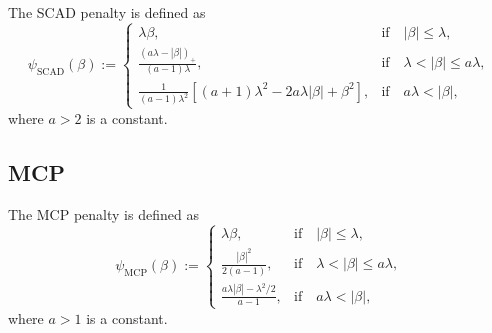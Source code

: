 The SCAD penalty is defined as
\begin{equation*}
	\psi_{\text{SCAD}}(\beta):=\left\{\begin{array}{ll}
		\lambda\beta,                                                                                  & \text{if}\quad\left|\beta\right|\leq\lambda,           \\
		\frac{\left(a\lambda-\left|\beta\right|\right)_{+}}{(a-1)\lambda},                             & \text{if}\quad\lambda<\left|\beta\right|\leq a\lambda, \\
		\frac{1}{(a-1)\lambda^{2}}\left[(a+1)\lambda^{2}-2a\lambda\left|\beta\right|+\beta^{2}\right], & \text{if}\quad a\lambda<\left|\beta\right|,
	\end{array}\right.
\end{equation*}
where \(a>2\) is a constant.

\subsection{MCP}

The MCP penalty is defined as
\begin{equation*}
	\psi_{\text{MCP}}(\beta):=\left\{\begin{array}{ll}
		\lambda\beta,                                         & \text{if}\quad\left|\beta\right|\leq\lambda,           \\
		\frac{\left|\beta\right|^{2}}{2(a-1)},                & \text{if}\quad\lambda<\left|\beta\right|\leq a\lambda, \\
		\frac{a\lambda\left|\beta\right|-\lambda^{2}/2}{a-1}, & \text{if}\quad a\lambda<\left|\beta\right|,
	\end{array}\right.
\end{equation*}
where \(a>1\) is a constant.
